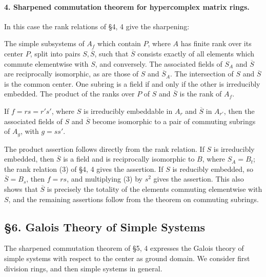 \documentclass[11pt]{article}
\begin{document}
\paragraph{4. Sharpened commutation theorem for hypercomplex matrix rings.}
In this case the rank relations of §4, 4 give the sharpening:

The simple subsystems of \(A_f\) which contain \(P\), where \(A\) has finite rank over its center \(P\), split into pairs \(S,\overline S\), such that \(\overline S\) consists exactly of all elements which commute elementwise with \(S\), and conversely. The associated fields of \(S_A\) and \(\overline S\) are reciprocally isomorphic, as are those of \(S\) and \(\overline S_A\). The intersection of \(S\) and \(\overline S\) is the common center. One subring is a field if and only if the other is irreducibly embedded. The product of the ranks over \(P\) of \(S\) and \(\overline S\) is the rank of \(A_f\).

If \(f=rs=r's'\), where \(S\) is irreducibly embeddable in \(A_r\) and \(\overline S\) in \(A_{r'}\), then the associated fields of \(S\) and \(\overline S\) become isomorphic to a pair of commuting subrings of \(A_g\), with \(g=ss'\).

The product assertion follows directly from the rank relation. If \(S\) is irreducibly embedded, then \(\overline S\) is a field and is reciprocally isomorphic to \(B\), where \(S_A=B_t\); the rank relation (3) of §4, 4 gives the assertion. If \(S\) is reducibly embedded, so \(\overline S=B_s\), then \(f=rs\), and multiplying (3) by \(s^2\) gives the assertion. This also shows that \(\overline S\) is precisely the totality of the elements commuting elementwise with \(S\), and the remaining assertions follow from the theorem on commuting subrings.

\clearpage

\subsection*{§6. Galois Theory of Simple Systems}

The sharpened commutation theorem of §5, 4 expresses the Galois theory of simple systems with respect to the center as ground domain. We consider first division rings, and then simple systems in general.
\end{document}
